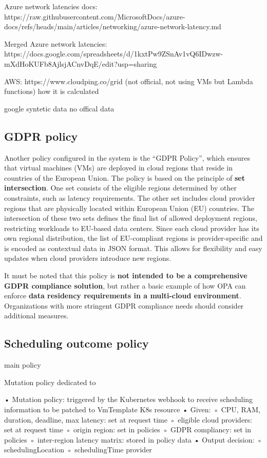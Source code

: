 Azure network latencies docs:
https://raw.githubusercontent.com/MicrosoftDocs/azure-docs/refs/heads/main/articles/networking/azure-network-latency.md

Merged Azure network latencies:
https://docs.google.com/spreadsheets/d/1kxtPw9ZSnAv1vQ6IDwzw-mXdHoKUFb8AjlsjACnvDqE/edit?usp=sharing 


AWS:
https://www.cloudping.co/grid (not official, not using VMs but Lambda functions)
how it is calculated

google
syntetic data
no offical data



\subsection{GDPR policy}

Another policy configured in the system is the ``GDPR Policy'', which ensures that virtual machines (VMs) are deployed in cloud regions that reside in countries of the European Union. 
The policy is based on the principle of \textbf{set intersection}. One set consists of the eligible regions determined by other constraints, such as latency requirements. The other set includes cloud provider regions that are physically located within European Union (EU) countries.
The intersection of these two sets defines the final list of allowed deployment regions, restricting workloads to EU-based data centers.
Since each cloud provider has its own regional distribution, the list of EU-compliant regions is provider-specific and is encoded as contextual data in JSON format. This allows for flexibility and easy updates when cloud providers introduce new regions.

It must be noted that this policy is \textbf{not intended to be a comprehensive GDPR compliance solution}, but rather a basic example of how OPA can enforce \textbf{data residency requirements in a multi-cloud environment}. Organizations with more stringent GDPR compliance needs should consider additional measures.

\subsection{Scheduling outcome policy}

main policy

Mutation policy dedicated to 


• Mutation policy: triggered by the Kubernetes webhook to receive scheduling information to be patched to VmTemplate K8s resource
• Given:
◦ {CPU, RAM, duration, deadline, max latency}: set at request time
◦ eligible cloud providers: set at request time
◦ origin region: set in policies
◦ GDPR compliancy: set in policies
◦ inter-region latency matrix: stored in policy data
• Output decision:
◦ schedulingLocation ◦ schedulingTime
provider




